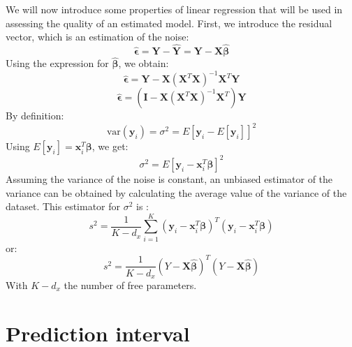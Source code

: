 We will now introduce some properties of linear regression that will be used in assessing the quality of an estimated model. First, we introduce the residual vector, which is an estimation of the noise:
$$
	\bm{\hat{\epsilon}} = \bm{Y} - \bm{\hat{Y}} = \bm{Y} - \bm{X} \bm{\hat{\beta}}
$$
Using the expression for $\bm{\hat{\beta}}$, we obtain:
$$
	\bm{\hat{\epsilon}} = \bm{Y} - \bm{X} \left(\bm{X}^T\bm{X}\right)^{-1}\bm{X}^T\bm{Y} 
$$
$$
	\bm{\hat{\epsilon}} = \left(\bm{I} - \bm{X} \left(\bm{X}^T\bm{X}\right)^{-1}\bm{X}^T\right)\bm{Y}
$$
By definition:
$$
	\textrm{var}(\mathbf{y}_i) = \sigma^2 = E\left[ \mathbf{y}_i - E[\mathbf{y}_i]\right]^2
$$
Using $E[\mathbf{y}_i] = \mathbf{x}_i^T\bm{\beta}$, we get:
$$
	\sigma^2 = E\left[ \mathbf{y}_i - \mathbf{x}_i^T\bm{\beta}\right]^2
$$
Assuming the variance of the noise is constant, an unbiased estimator of the variance can be obtained by calculating the average value of the variance of the dataset. This estimator for $\sigma^2$ is :
$$
	s^2 = \frac{1}{K-d_x}\sum_{i=1}^{K}{\left(\mathbf{y}_i - \mathbf{x}_i^T\bm{\beta}\right)^T\left(\mathbf{y}_i - \mathbf{x}_i^T\bm{\beta}\right)}
$$
or:
\begin{equation}\label{eqn:app-statistics_s}
	s^2 = \frac{1}{K-d_x}\left(Y - \bm{X}\bm\hat{{\beta}}\right)^T\left(Y - \bm{X}\bm\hat{{\beta}}\right)
\end{equation}
With $K-d_x$ the number of free parameters. 

\section{Prediction interval}\label{sec:app-statistics_PredInt}

